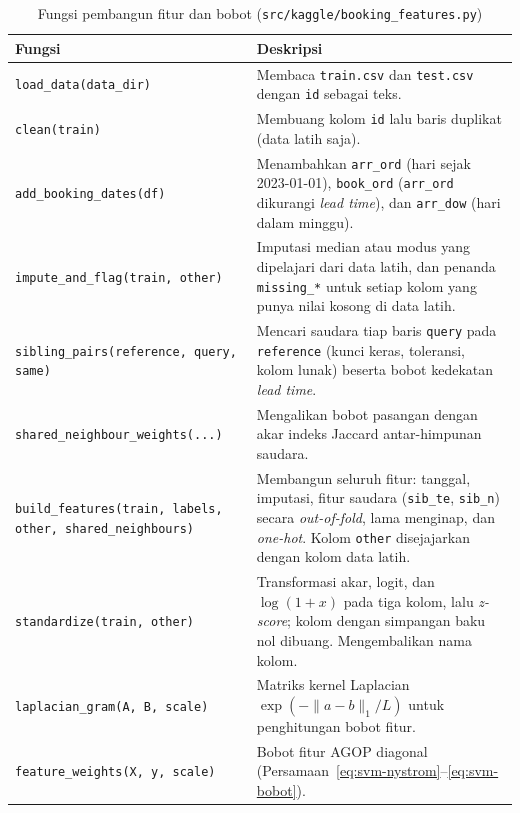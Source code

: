 \begin{table}[H]
	\centering
	\caption{Fungsi pembangun fitur dan bobot (\texttt{src/kaggle/booking\_features.py})}
	\label{tab:svm-fitur-fungsi}
	\small
	\begin{tabularx}{\textwidth}{>{\raggedright\arraybackslash}p{4.8cm} Y}
		\toprule
		\textbf{Fungsi} & \textbf{Deskripsi} \\
		\midrule
		\texttt{load\_data(data\_dir)} & Membaca \texttt{train.csv} dan \texttt{test.csv} dengan \texttt{id} sebagai teks. \\
		\texttt{clean(train)} & Membuang kolom \texttt{id} lalu baris duplikat (data latih saja). \\
		\texttt{add\_booking\_dates(df)} & Menambahkan \texttt{arr\_ord} (hari sejak 2023-01-01), \texttt{book\_ord} (\texttt{arr\_ord} dikurangi \textit{lead time}), dan \texttt{arr\_dow} (hari dalam minggu). \\
		\texttt{impute\_and\_flag(train, other)} & Imputasi median atau modus yang dipelajari dari data latih, dan penanda \texttt{missing\_*} untuk setiap kolom yang punya nilai kosong di data latih. \\
		\texttt{sibling\_pairs(reference, query, same)} & Mencari saudara tiap baris \texttt{query} pada \texttt{reference} (kunci keras, toleransi, kolom lunak) beserta bobot kedekatan \textit{lead time}. \\
		\texttt{shared\_neighbour\_weights(...)} & Mengalikan bobot pasangan dengan akar indeks Jaccard antar-himpunan saudara. \\
		\texttt{build\_features(train, labels, other, shared\_neighbours)} & Membangun seluruh fitur: tanggal, imputasi, fitur saudara (\texttt{sib\_te}, \texttt{sib\_n}) secara \textit{out-of-fold}, lama menginap, dan \textit{one-hot}. Kolom \texttt{other} disejajarkan dengan kolom data latih. \\
		\texttt{standardize(train, other)} & Transformasi akar, logit, dan $\log(1+x)$ pada tiga kolom, lalu \textit{z-score}; kolom dengan simpangan baku nol dibuang. Mengembalikan nama kolom. \\
		\texttt{laplacian\_gram(A, B, scale)} & Matriks kernel Laplacian $\exp(-\lVert a-b\rVert_1/L)$ untuk penghitungan bobot fitur. \\
		\texttt{feature\_weights(X, y, scale)} & Bobot fitur AGOP diagonal (Persamaan~\eqref{eq:svm-nystrom}--\eqref{eq:svm-bobot}). \\
		\bottomrule
	\end{tabularx}
\end{table}

